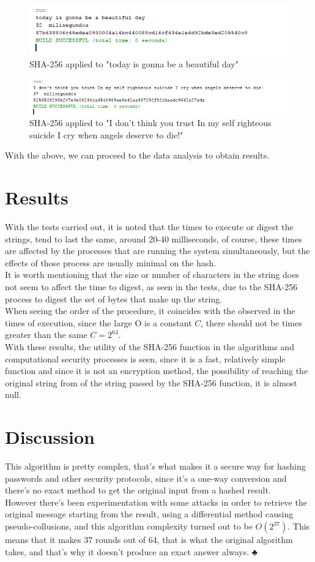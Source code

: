 \documentclass[journal]{IEEEtran}
\begin{document}
\begin{figure}[H] 
	\centering \includegraphics[width=.70\columnwidth]{Code_today.png}
	\caption{
		\label{fig:samplesetup}
		SHA-256 applied to "today is gonna be a beautiful day"
	}
\end{figure}
\begin{figure}[H] 
	\centering \includegraphics[width=.70\columnwidth]{Code_Long.png}
	\caption{
		\label{fig:samplesetup}
		SHA-256 applied to "I don't think you trust In my self righteous suicide I cry when angels deserve to die!"
	}
\end{figure}

With the above, we can proceed to the data analysis to obtain results.
\section{Results}
With the tests carried out, it is noted that the times to execute or digest the strings, tend to last the same, around 20-40 milliseconds,
of course, these times are affected by the processes that are running the system simultaneously, but the effects of those process are usually minimal on the hash.\\It is worth mentioning that the size or number of characters in the string does not seem to affect the time to digest, as seen in the tests, due to the SHA-256 process to digest the set of bytes that make up the string.\\When seeing the order of the procedure, it coincides with the observed in the times of execution, since the large O is a constant $C$, there should not be times greater than the same $C=2^{64}$.\\With these results, the utility of the SHA-256 function in the algorithms and computational security processes is seen, since it is a fast, relatively simple function and since it is not an encryption method, the possibility of reaching the original string from of the string passed by the SHA-256 function, it is almost null.
\section{Discussion}
This algorithm is pretty complex, that's what makes it a secure way for hashing passwords and other security protocols, since it's a one-way conversion and there's no exact method to get the original input from a hashed result.\\
However there's been experimentation with some attacks in order to retrieve the original message starting from the result, using a differential method causing pseudo-collusions, and this algorithm complexity turned out to be $O(2^{37})$. This means that it makes 37 rounds out of 64, that is what the original algorithm takes, and that's why it doesn't produce an exact answer always.
♣
\end{document}
